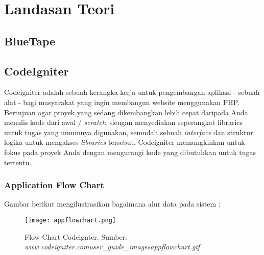 \chapter{Landasan Teori}
\label{chap:teori}

\section{BlueTape}
\label{sec:blurtape}


\section{CodeIgniter}
\label{sec:code_igniter}
Codeigniter adalah sebuah kerangka kerja untuk pengembangan aplikasi - sebuah alat - bagi masyarakat yang ingin membangun website menggunakan PHP. Bertujuan agar proyek yang sedang dikembangkan lebih cepat daripada Anda menulis kode dari awal / \textit{scratch}, dengan menyediakan seperangkat libraries untuk tugas yang umumnya digunakan, semudah sebuah \textit{interface} dan struktur logika untuk mengakses \textit{libraries} tersebut. Codeigniter memungkinkan untuk fokus pada proyek Anda dengan mengurangi kode yang dibutuhkan untuk tugas tertentu. \cite{codeIgniter:17}
\subsection{Application Flow Chart}
\label{subs:app_flowchart}
Gambar berikut mengilustrasikan bagaimana alur data pada sistem :

\begin{figure} [H]
	\centering  
	\texttt{[image: appflowchart.png]}  
	\caption[Flow Chart Codeignter. Sumber:\/\/www.codeigniter.com\/user\_guide\/\_images\/appflowchart.gif]{Flow Chart Codeignter. Sumber:\textit{ \/\/www.codeigniter.com\/user\_guide\/\_images\/appflowchart.gif}} 
	\label{fig:flow-chart-CodeIgniter} 
\end{figure}

